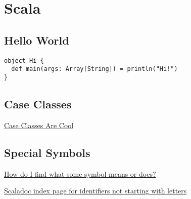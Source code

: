 
\section{Scala}

\subsection{Hello World}

\begin{lstlisting}
object Hi {
  def main(args: Array[String]) = println("Hi!")
}
\end{lstlisting}


\subsection{Case Classes}

\href{http://www.codecommit.com/blog/scala/case-classes-are-cool}{Case Classes Are Cool}

\subsection{Special Symbols}



\href{http://docs.scala-lang.org/tutorials/FAQ/finding-symbols.html}{How do I
find what some symbol means or does?}

\href{http://www.scala-lang.org/api/current/index.html#index.index-_}{Scaladoc
index page for identifiers not starting with letters}
